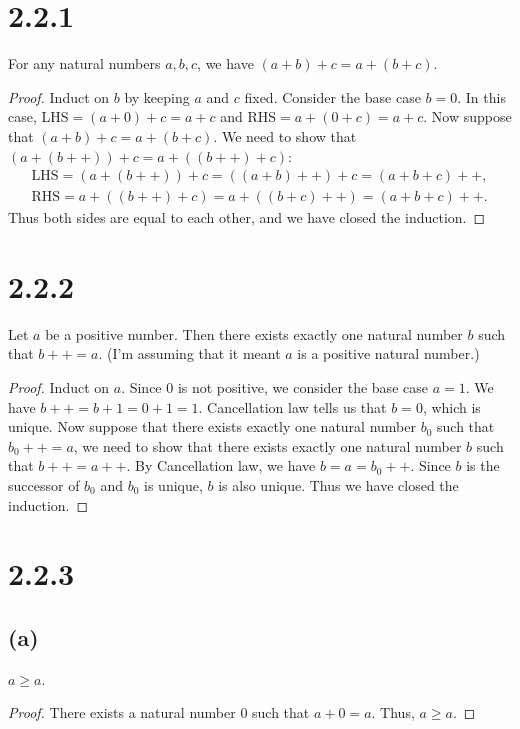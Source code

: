 \documentclass[12pt, letter]{article}
\begin{document}
\section*{2.2.1}
For any natural numbers $a, b, c$, we have $(a+b)+c=a+(b+c)$.
\begin{proof}
    Induct on $b$ by keeping $a$ and $c$ fixed. Consider the base case $b=0$. In this case, LHS$=(a+0)+c=a+c$ and RHS$=a+(0+c)=a+c$. Now suppose that 
    $(a+b)+c=a+(b+c)$. We need to show that $(a+(b++))+c=a+((b++)+c)$: 
    \begin{equation*}
        \begin{aligned}
            \text{LHS}=(a+(b++))+c=((a+b)++)+c=(a+b+c)++,\\
            \text{RHS}=a+((b++)+c)=a+((b+c)++)=(a+b+c)++.
        \end{aligned}
    \end{equation*}
    Thus both sides are equal to each other, and we have closed the induction.
\end{proof}

\section*{2.2.2}
Let $a$ be a positive number. Then there exists exactly one natural number $b$ such that $b++=a$. (I'm assuming that it meant $a$ is a positive natural number.)
\begin{proof}
    Induct on $a$. Since $0$ is not positive, we consider the base case $a=1$. We have $b++=b+1=0+1=1$. Cancellation law tells us that $b=0$, which is unique. Now suppose that there exists exactly one natural number $b_0$ such that $b_0++=a$, we need to show that
    there exists exactly one natural number $b$ such that $b++=a++$. By Cancellation law, we have $b=a=b_0++$. Since $b$ is the successor of $b_0$ and $b_0$ is unique, $b$ is also unique. Thus we have closed the induction.
\end{proof}

\section*{2.2.3}
\subsection*{(a)}
$a\geq a$.
\begin{proof}
    There exists a natural number $0$ such that $a+0=a$. Thus, $a\geq a$.
\end{proof}
\end{document}
